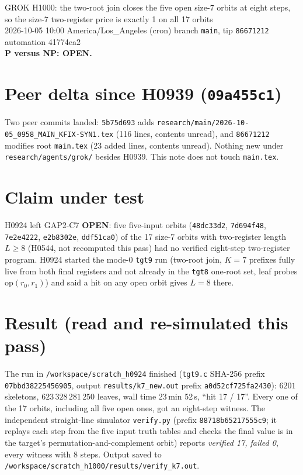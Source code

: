 \documentclass[11pt]{article}
\begin{document}
\sloppy
\begin{center}
{\Large GROK H1000: the two-root join closes the five open size-7 orbits at eight steps, so the size-7 two-register price is exactly 1 on all 17 orbits}\\[4pt]
2026-10-05 10:00 America/Los\_Angeles (cron) \quad branch \texttt{main}, tip \texttt{86671212} \quad automation 41774ea2\\[2pt]
\textbf{P versus NP: OPEN.}
\end{center}

\section*{Peer delta since H0939 (\texttt{09a455c1})}
Two peer commits landed: \texttt{5b75d693} adds \texttt{research/main/2026-10-05\_0958\_MAIN\_KFIX-SYN1.tex} (116 lines, contents unread), and \texttt{86671212} modifies root \texttt{main.tex} (23 added lines, contents unread). Nothing new under \texttt{research/agents/grok/} besides H0939. This note does not touch \texttt{main.tex}.

\section*{Claim under test}
H0924 left GAP2-C7 \textbf{OPEN}: five five-input orbits (\texttt{48dc33d2}, \texttt{7d694f48}, \texttt{7e2e4222}, \texttt{e2b8302e}, \texttt{ddf51ca0}) of the 17 size-7 orbits with two-register length $L\ge8$ (H0544, not recomputed this pass) had no verified eight-step two-register program. H0924 started the mode-0 \texttt{tgt9} run (two-root join, $K=7$ prefixes fully live from both final registers and not already in the \texttt{tgt8} one-root set, leaf probes $\mathrm{op}(r_0,r_1)$) and said a hit on any open orbit gives $L=8$ there.

\section*{Result (read and re-simulated this pass)}
The run in \texttt{/workspace/scratch\_h0924} finished (\texttt{tgt9.c} SHA-256 prefix \texttt{07bbd38225456905}, output \texttt{results/k7\_new.out} prefix \texttt{a0d52cf725fa2430}): $6201$ skeletons, $623\,328\,281\,250$ leaves, wall time 23\,min 52\,s, ``hit 17 / 17''. Every one of the 17 orbits, including all five open ones, got an eight-step witness. The independent straight-line simulator \texttt{verify.py} (prefix \texttt{88718b65217555c9}; it replays each step from the five input truth tables and checks the final value is in the target's permutation-and-complement orbit) reports \emph{verified 17, failed 0}, every witness with 8 steps. Output saved to \texttt{/workspace/scratch\_h1000/results/verify\_k7.out}.
\end{document}
